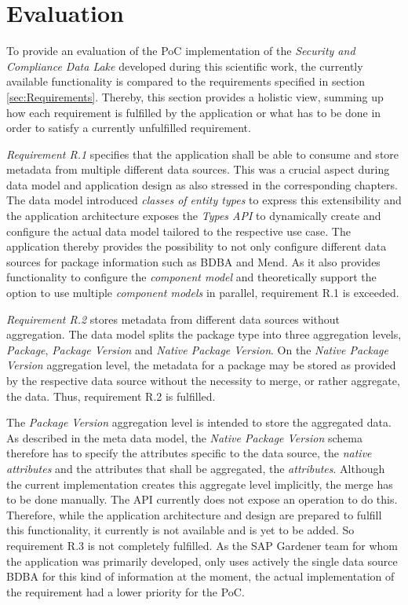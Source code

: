 \section{Evaluation}
To provide an evaluation of the PoC implementation of the \emph{Security and Compliance Data Lake} developed during this scientific work, the currently available functionality is compared to the requirements specified in section \ref{sec:Requirements}. Thereby, this section provides a holistic view, summing up how each requirement is fulfilled by the application or what has to be done in order to satisfy a currently unfulfilled requirement.\par
\emph{Requirement R.1} specifies that the application shall be able to consume and store metadata from multiple different data sources. This was a crucial aspect during data model and application design as also stressed in the corresponding chapters. The data model introduced \emph{classes of entity types} to express this extensibility and the application architecture exposes the \emph{Types API} to dynamically create and configure the actual data model tailored to the respective use case. The application thereby provides the possibility to not only configure different data sources for package information such as BDBA and Mend. As it also provides functionality to configure the \emph{component model} and theoretically support the option to use multiple \emph{component models} in parallel, requirement R.1 is exceeded.\par
\emph{Requirement R.2} stores metadata from different data sources without aggregation. The data model splits the package type into three aggregation levels, \emph{Package}, \emph{Package Version} and \emph{Native Package Version}. On the \emph{Native Package Version} aggregation level, the metadata for a package may be stored as provided by the respective data source without the necessity to merge, or rather aggregate, the data. Thus, requirement R.2 is fulfilled.\par
The \emph{Package Version} aggregation level is intended to store the aggregated data. As described in the meta data model, the \emph{Native Package Version} schema therefore has to specify the attributes specific to the data source, the \emph{native attributes} and the attributes that shall be aggregated, the \emph{attributes}. Although the current implementation creates this aggregate level implicitly, the merge has to be done manually. The API currently does not expose an operation to do this. Therefore, while the application architecture and design are prepared to fulfill this functionality, it currently is not available and is yet to be added. So requirement R.3 is not completely fulfilled. As the SAP Gardener team for whom the application was primarily developed, only uses actively the single data source BDBA for this kind of information at the moment, the actual implementation of the requirement had a lower priority for the PoC.\par
